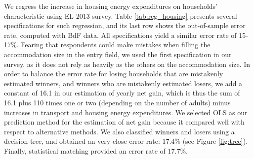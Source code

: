 \documentclass[12pt]{article} %
\begin{document}
\begin{appendices}
We regress the increase in housing energy expenditures on households' characteristic using EL 2013 survey. Table \ref{tab:reg_housing} presents several specifications for such regression, and its last row shows the out-of-sample error rate, computed with BdF data. All specifications yield a similar error rate of 15-17\%. Fearing that respondents could make mistakes when filling the accommodation size in the entry field, we used the first specification in our survey, as it does not rely as heavily as the others on the accommodation size. In order to balance the error rate for losing households that are mistakenly estimated winners, and winners who are mistakenly estimated losers, we add a constant of 16.1 in our estimation of yearly net gain, which is thus the sum of 16.1 plus 110 times one or two (depending on the number of adults) minus increases in transport and housing energy expenditures. We selected OLS as our prediction method for the estimation of net gain because it compared well with respect to alternative methods. We also classified winners and losers using a decision tree, and obtained an very close error rate: 17.4\% (see Figure \ref{fig:tree}). Finally, statistical matching provided an error rate of 17.7\%.


\end{appendices}
\end{document}
